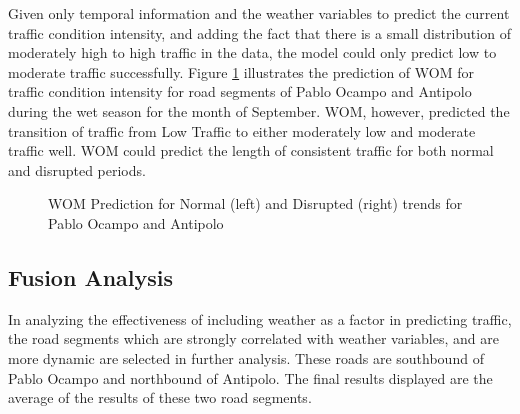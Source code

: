 Given only temporal information and the weather variables to predict the current traffic condition intensity, and adding the fact that there is a small distribution of moderately high to high traffic in the data, the model could only predict low to moderate traffic successfully. Figure \ref{fig:WOM_normal_disrption_pocampo_antipolo_wet} illustrates the prediction of WOM for traffic condition intensity for road segments of Pablo Ocampo and Antipolo during the wet season for the month of September. WOM, however, predicted the transition of traffic from Low Traffic to either moderately low and moderate traffic well. WOM could predict the length of consistent traffic for both normal and disrupted periods. 

\begin{figure}[h]
  \centering
  \captionsetup{justification=centering}
  \caption{WOM Prediction for Normal (left) and Disrupted (right) trends for Pablo Ocampo and Antipolo}
  \label{fig:WOM_normal_disrption_pocampo_antipolo_wet}
\end{figure}


\subsection{Fusion Analysis}
In analyzing the effectiveness of including weather as a factor in predicting traffic, the road segments which are strongly correlated with weather variables, and are more dynamic are selected in further analysis. These roads are southbound of Pablo Ocampo and northbound of Antipolo. The final results displayed are the average of the results of these two road segments.


